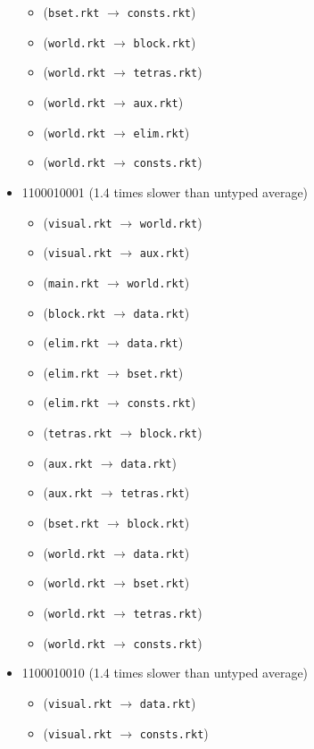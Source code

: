 \documentclass{article}
\newcommand{\mono}[1]{\texttt{#1}}
\begin{document}
\begin{itemize}
\begin{itemize}
  \item (\mono{bset.rkt} $\rightarrow$ \mono{consts.rkt})
  \item (\mono{world.rkt} $\rightarrow$ \mono{block.rkt})
  \item (\mono{world.rkt} $\rightarrow$ \mono{tetras.rkt})
  \item (\mono{world.rkt} $\rightarrow$ \mono{aux.rkt})
  \item (\mono{world.rkt} $\rightarrow$ \mono{elim.rkt})
  \item (\mono{world.rkt} $\rightarrow$ \mono{consts.rkt})
  \end{itemize}
\item 1100010001 (1.4 times slower than untyped average)
  \begin{itemize}
  \item (\mono{visual.rkt} $\rightarrow$ \mono{world.rkt})
  \item (\mono{visual.rkt} $\rightarrow$ \mono{aux.rkt})
  \item (\mono{main.rkt} $\rightarrow$ \mono{world.rkt})
  \item (\mono{block.rkt} $\rightarrow$ \mono{data.rkt})
  \item (\mono{elim.rkt} $\rightarrow$ \mono{data.rkt})
  \item (\mono{elim.rkt} $\rightarrow$ \mono{bset.rkt})
  \item (\mono{elim.rkt} $\rightarrow$ \mono{consts.rkt})
  \item (\mono{tetras.rkt} $\rightarrow$ \mono{block.rkt})
  \item (\mono{aux.rkt} $\rightarrow$ \mono{data.rkt})
  \item (\mono{aux.rkt} $\rightarrow$ \mono{tetras.rkt})
  \item (\mono{bset.rkt} $\rightarrow$ \mono{block.rkt})
  \item (\mono{world.rkt} $\rightarrow$ \mono{data.rkt})
  \item (\mono{world.rkt} $\rightarrow$ \mono{bset.rkt})
  \item (\mono{world.rkt} $\rightarrow$ \mono{tetras.rkt})
  \item (\mono{world.rkt} $\rightarrow$ \mono{consts.rkt})
  \end{itemize}
\item 1100010010 (1.4 times slower than untyped average)
  \begin{itemize}
  \item (\mono{visual.rkt} $\rightarrow$ \mono{data.rkt})
  \item (\mono{visual.rkt} $\rightarrow$ \mono{consts.rkt})

\end{itemize}
\end{itemize}
\end{document}
